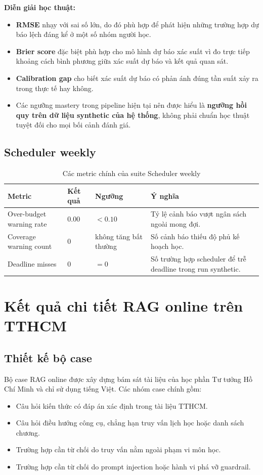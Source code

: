 \documentclass[12pt,a4paper]{article}
\begin{document}
\textbf{Diễn giải học thuật:}
\begin{itemize}
    \item \textbf{RMSE} nhạy với sai số lớn, do đó phù hợp để phát hiện những trường hợp dự báo lệch đáng kể ở một số nhóm người học.
    \item \textbf{Brier score} đặc biệt phù hợp cho mô hình dự báo xác suất vì đo trực tiếp khoảng cách bình phương giữa xác suất dự báo và kết quả quan sát.
    \item \textbf{Calibration gap} cho biết xác suất dự báo có phản ánh đúng tần suất xảy ra trong thực tế hay không.
    \item Các ngưỡng mastery trong pipeline hiện tại nên được hiểu là \textbf{ngưỡng hồi quy trên dữ liệu synthetic của hệ thống}, không phải chuẩn học thuật tuyệt đối cho mọi bối cảnh đánh giá.
\end{itemize}

\subsection{Scheduler weekly}

\begin{table}[H]
\centering
\small
\begin{tabularx}{\textwidth}{L{3.5cm} L{2.0cm} L{2.1cm} Y}
\toprule
\textbf{Metric} & \textbf{Kết quả} & \textbf{Ngưỡng} & \textbf{Ý nghĩa} \\
\midrule
Over-budget warning rate & 0.00 & $< 0.10$ & Tỷ lệ cảnh báo vượt ngân sách ngoài mong đợi. \\
Coverage warning count & 0 & không tăng bất thường & Số cảnh báo thiếu độ phủ kế hoạch học. \\
Deadline misses & 0 & $= 0$ & Số trường hợp scheduler để trễ deadline trong run synthetic. \\
\bottomrule
\end{tabularx}
\caption{Các metric chính của suite Scheduler weekly}
\end{table}

\section{Kết quả chi tiết RAG online trên TTHCM}

\subsection{Thiết kế bộ case}

Bộ case RAG online được xây dựng bám sát tài liệu của học phần Tư tưởng Hồ Chí Minh và chỉ sử dụng tiếng Việt. Các nhóm case chính gồm:
\begin{itemize}
    \item Câu hỏi kiến thức có đáp án xác định trong tài liệu TTHCM.
    \item Câu hỏi điều hướng công cụ, chẳng hạn truy vấn lịch học hoặc danh sách chương.
    \item Trường hợp cần từ chối do truy vấn nằm ngoài phạm vi môn học.
    \item Trường hợp cần từ chối do prompt injection hoặc hành vi phá vỡ guardrail.
\end{itemize}
\end{document}
